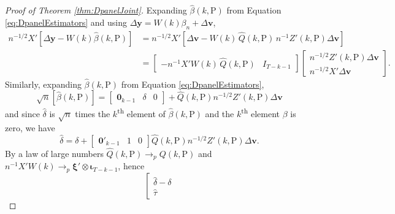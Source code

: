 \begin{proof}[Proof of Theorem \ref{thm:DpanelJoint}]
  Expanding $\widehat{\beta}(k,\text{P})$ from Equation \ref{eq:DpanelEstimators} and using $\Delta \mathbf{y} = W(k) \beta_n + \Delta \mathbf{v}$, 
  \begin{align*}
    n^{-1/2}X'\left[ \Delta \mathbf{y} - W(k)\widehat{\beta}(k,\text{P})  \right] 
    &= n^{-1/2}X'\left[ \Delta \mathbf{v}  - W(k)\, \widehat{Q}(k,\text{P}) \, n^{-1} Z'(k,\text{P})\Delta \mathbf{v}\right] \\
    &= \left[
    \begin{array}{cc}
      -n^{-1} X'W(k) \, \widehat{Q}(k,\text{P}) & I_{T-k-1}
    \end{array}
  \right] 
  \left[
  \begin{array}{c}
    n^{-1/2}Z'(k,\text{P}) \Delta \mathbf{v} \\
    n^{-1/2} X' \Delta \mathbf{v}
  \end{array}
\right].
  \end{align*}
  Similarly, expanding $\widehat{\beta}(k,\text{P})$ from Equation \ref{eq:DpanelEstimators},
  \[
    \sqrt{n}\left[ \widehat{\beta}(k,\text{P}) \right] = \left[
    \begin{array}{ccc}
      \mathbf{0}_{k-1} & \delta & 0
    \end{array}
  \right] + \widehat{Q}(k,\text{P}) n^{-1/2}Z'(k,\text{P}) \Delta \mathbf{v}
  \]
  and since $\widehat{\delta}$ is $\sqrt{n}$ times the $k$\textsuperscript{th} element of $\widehat{\beta}(k,\text{P})$ and the $k$\textsuperscript{th} element $\beta$ is zero, we have
  \[
    \widehat{\delta} = \delta + \left[
    \begin{array}{ccc}
    \mathbf{0}'_{k-1} & 1 & 0 
    \end{array}
  \right] \widehat{Q}(k,\text{P}) n^{-1/2} Z'(k,\text{P})\Delta \mathbf{v}.
  \]
  By a law of large numbers $\widehat{Q}(k,\text{P}) \rightarrow_p Q(k,\text{P})$ and $n^{-1}X'W(k) \rightarrow_p \boldsymbol{\xi}' \otimes \boldsymbol{\iota}_{T-k-1}$, hence 
  \[
    \left[
    \begin{array}{c}
      \widehat{\delta} - \delta \\ \widehat{\tau}

\end{array}\]
\end{proof}
